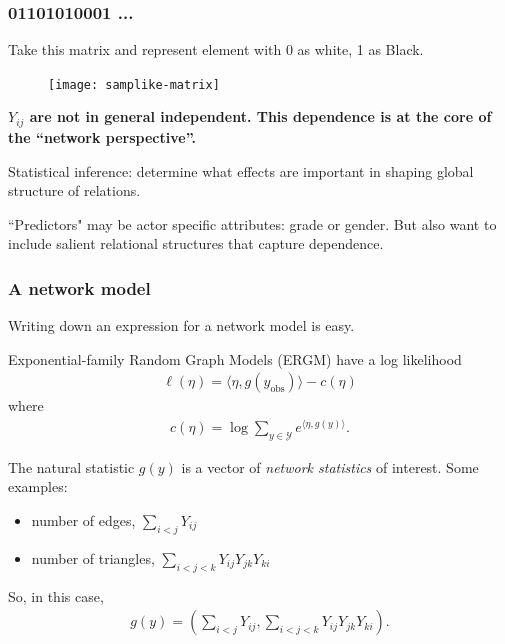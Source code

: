 \documentclass[slidestop,compress, 10pt]{beamer}
\def\YY{{\mathcal Y}}
\newcommand{\inner}[1]{\langle #1 \rangle}
\newcommand{\yobs}{y_{\text{obs}}}
\begin{document}
\frame
{
\frametitle{01101010001 ...}
Take this matrix and represent element with 0 as white, 1 as Black.
\begin{figure}
\begin{center} 
\texttt{[image: samplike-matrix]}
\end{center} 
\end{figure}
\textbf{$Y_{ij}$ are not in general independent.  This dependence is at the core of the ``network perspective''.}
\vspace{1mm}

Statistical inference: determine what effects are important in shaping 
global structure of relations.  
\vspace{1mm}

``Predictors" may be actor specific attributes: grade or gender.
But also want to include salient relational structures that capture dependence.
}

\frame
{
\frametitle{A network model}

Writing down an expression for a network model is easy.  

Exponential-family Random Graph Models (ERGM) have a log likelihood
\begin{align*}%
	\ell( \eta) = \inner{\eta, g(\yobs)} - c(\eta)
\end{align*}
where
\begin{align*}
	c(\eta) = \log \sum_{y \in \YY} e^{\inner{\eta, g(y)}}.
\end{align*}

The natural statistic $g(y)$ is a vector of \emph{network statistics} of interest.  Some examples:
\begin{itemize}
	\item number of edges, $\sum_{i<j} Y_{ij}$
	\item number of triangles, $\sum_{i < j < k} Y_{ij}Y_{jk}Y_{ki}$
\end{itemize}
So, in this case,
\begin{align*}
	g(y) = \left( \sum_{i<j} Y_{ij}, 
					\sum_{i < j < k} Y_{ij}Y_{jk}Y_{ki} \right ).
\end{align*}


}
\end{document}
